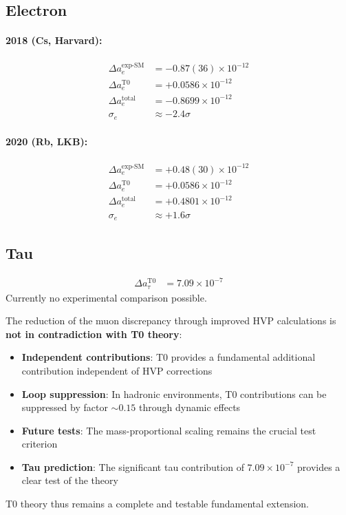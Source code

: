 \documentclass[12pt,a4paper]{article}
\theoremstyle{definition}
\begin{document}
	\subsection*{Electron}
	\paragraph{2018 (Cs, Harvard):}
	\begin{align}
		\Delta a_e^{\text{exp-SM}} &= -0.87(36) \times 10^{-12}\\
		\Delta a_e^{\text{T0}} &= +0.0586 \times 10^{-12}\\
		\Delta a_e^{\text{total}} &= -0.8699 \times 10^{-12}\\
		\sigma_e &\approx -2.4\sigma
	\end{align}
	
	\paragraph{2020 (Rb, LKB):}
	\begin{align}
		\Delta a_e^{\text{exp-SM}} &= +0.48(30) \times 10^{-12}\\
		\Delta a_e^{\text{T0}} &= +0.0586 \times 10^{-12}\\
		\Delta a_e^{\text{total}} &= +0.4801 \times 10^{-12}\\
		\sigma_e &\approx +1.6\sigma
	\end{align}
	
	\subsection*{Tau}
	\begin{align}
		\Delta a_\tau^{\text{T0}} &= 7.09 \times 10^{-7}
	\end{align}
	Currently no experimental comparison possible.
	
	\begin{verification}
		The reduction of the muon discrepancy through improved HVP calculations is \textbf{not in contradiction with T0 theory}:
		
		\begin{itemize}
			\item \textbf{Independent contributions}: T0 provides a fundamental additional contribution independent of HVP corrections
			\item \textbf{Loop suppression}: In hadronic environments, T0 contributions can be suppressed by factor $\sim0.15$ through dynamic effects
			\item \textbf{Future tests}: The mass-proportional scaling remains the crucial test criterion
			\item \textbf{Tau prediction}: The significant tau contribution of $7.09 \times 10^{-7}$ provides a clear test of the theory
		\end{itemize}
		
		T0 theory thus remains a complete and testable fundamental extension.
	\end{verification}
	
\end{document}
